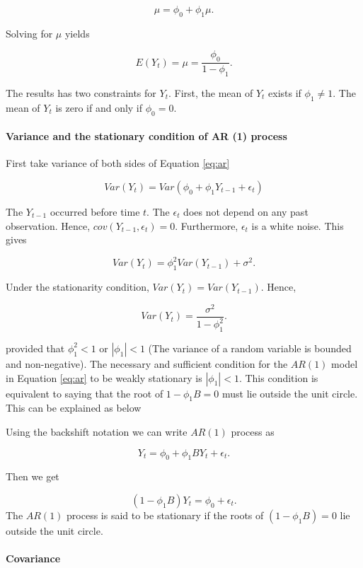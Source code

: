 \documentclass[]{book}
\let\oldparagraph\paragraph
\renewcommand{\paragraph}[1]{\oldparagraph{#1}\mbox{}}
\begin{document}
\[\mu = \phi_0+\phi_1\mu.\]

Solving for \(\mu\) yields

\begin{equation}
  \label{eq:2}
E(Y_t)=\mu=\frac{\phi_0}{1-\phi_1}.
\end{equation}

The results has two constraints for \(Y_t\). First, the mean of \(Y_t\) exists if \(\phi_1 \neq 1 .\) The mean of \(Y_t\) is zero if and only if \(\phi_0=0\).

\hypertarget{variance-and-the-stationary-condition-of-ar-1-process}{%
\paragraph{Variance and the stationary condition of AR (1) process}\label{variance-and-the-stationary-condition-of-ar-1-process}}

First take variance of both sides of Equation \eqref{eq:ar}

\[Var(Y_t)=Var(\phi_0+\phi_1 Y_{t-1}+\epsilon_t)\]

The \(Y_{t-1}\) occurred before time \(t\). The \(\epsilon_t\) does not depend on any past observation. Hence, \(cov(Y_{t-1}, \epsilon_t)= 0\). Furthermore, \({\epsilon_t}\) is a white noise. This gives

\[Var(Y_t)=\phi_1^2 Var(Y_{t-1})+\sigma^2.\]

Under the stationarity condition, \(Var(Y_t)=Var(Y_{t-1})\). Hence,

\[Var(Y_t)=\frac{\sigma^2}{1-\phi_1^2}.\]

provided that \(\phi_1^2 < 1\) or \(|\phi_1| < 1\) (The variance of a random variable is bounded and non-negative). The necessary and sufficient condition for the \(AR(1)\) model in Equation \eqref{eq:ar} to be weakly stationary is \(|\phi_1| < 1\). This condition is equivalent to saying that the root of \(1-\phi_1B = 0\) must lie outside the unit circle. This can be explained as below

Using the backshift notation we can write \(AR(1)\) process as

\[Y_t = \phi_0 + \phi_1BY_{t} + \epsilon_t.\]

Then we get

\[(1-\phi_1B)Y_t=\phi_0 + \epsilon_t.\] The \(AR(1)\) process is said to be stationary if the roots of \((1-\phi_1B)=0\) lie outside the unit circle.

\hypertarget{covariance}{%
\paragraph{Covariance}\label{covariance}}
\end{document}
